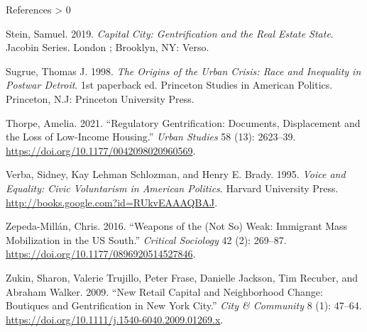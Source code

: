 \documentclass[
  ignorenonframetext,
  aspectratio=169]{beamer}
\newlength{\cslhangindent}
\newenvironment{CSLReferences}[2] %
 {%
  \setlength{\parindent}{0pt}
  \ifodd #1 \everypar{\setlength{\hangindent}{\cslhangindent}}\ignorespaces\fi
  \ifnum #2 > 0
  \setlength{\parskip}{#2\baselineskip}
  \fi
 }%
 {}
\begin{document}
\begin{frame}[allowframebreaks]{References}
\begin{CSLReferences}{1}{0}
\leavevmode\hypertarget{ref-Stein2019}{}%
Stein, Samuel. 2019. \emph{Capital City: Gentrification and the Real
Estate State}. Jacobin Series. {London ; Brooklyn, NY}: {Verso}.

\leavevmode\hypertarget{ref-Sugrue1998}{}%
Sugrue, Thomas J. 1998. \emph{The Origins of the Urban Crisis: Race and
Inequality in Postwar {Detroit}}. 1st paperback ed. Princeton Studies in
{American} Politics. {Princeton, N.J}: {Princeton University Press}.

\leavevmode\hypertarget{ref-Thorpe2021}{}%
Thorpe, Amelia. 2021. {``Regulatory Gentrification: Documents,
Displacement and the Loss of Low-Income Housing.''} \emph{Urban Studies}
58 (13): 2623--39. \url{https://doi.org/10.1177/0042098020960569}.

\leavevmode\hypertarget{ref-Verba1995}{}%
Verba, Sidney, Kay Lehman Schlozman, and Henry E. Brady. 1995.
\emph{Voice and {Equality}: Civic {Voluntarism} in {American Politics}}.
{Harvard University Press}.
\url{http://books.google.com?id=RUkvEAAAQBAJ}.

\leavevmode\hypertarget{ref-Zepeda-Millan2016}{}%
Zepeda-Millán, Chris. 2016. {``Weapons of the ({Not So}) {Weak}:
Immigrant {Mass Mobilization} in the {US South}.''} \emph{Critical
Sociology} 42 (2): 269--87.
\url{https://doi.org/10.1177/0896920514527846}.

\leavevmode\hypertarget{ref-Zukin2009}{}%
Zukin, Sharon, Valerie Trujillo, Peter Frase, Danielle Jackson, Tim
Recuber, and Abraham Walker. 2009. {``New {Retail Capital} and
{Neighborhood Change}: Boutiques and {Gentrification} in {New York
City}.''} \emph{City \& Community} 8 (1): 47--64.
\url{https://doi.org/10.1111/j.1540-6040.2009.01269.x}.

\end{CSLReferences}
\end{frame}
\end{document}
